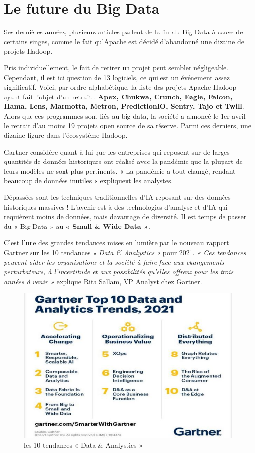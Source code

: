 \section{Le future du Big Data}
Ses dernières années, plusieurs articles parlent de la fin du Big Data à cause de certains singes, comme le fait qu’Apache est décidé d’abandonné une dizaine de projets Hadoop.

Pris individuellement, le fait de retirer un projet peut sembler négligeable. Cependant, il est ici question de 13 logiciels, ce qui est un événement assez significatif. Voici, par ordre alphabétique, la liste des projets Apache Hadoop ayant fait l’objet d’un retrait : \textbf{Apex, Chukwa, Crunch, Eagle, Falcon, Hama, Lens, Marmotta, Metron, PredictionIO, Sentry, Tajo et Twill}. Alors que ces programmes sont liés au big data, la société a annoncé le 1er avril le retrait d’au moins 19 projets open source de sa réserve. Parmi ces derniers, une dizaine figure dans l’écosystème Hadoop.

Gartner considère quant à lui que les entreprises qui reposent sur de larges quantités de données historiques ont réalisé avec la pandémie que la plupart de leurs modèles ne sont plus pertinents. « La pandémie a tout changé, rendant beaucoup de données inutiles » expliquent les analystes.

Dépassées sont les techniques traditionnelles d’IA reposant sur des données historiques massives ! L’avenir est à des technologies d’analyse et d’IA qui requièrent moins de données, mais davantage de diversité. Il est temps de passer du « Big Data » au \textbf{« Small \& Wide Data »}.

C’est l’une des grandes tendances mises en lumière par le nouveau rapport Gartner sur les 10 tendances \textit{ « Data \& Analystics »} pour 2021. \textit{ « Ces tendances peuvent aider les organisations et la société à faire face aux changements perturbateurs, à l’incertitude et aux possibilités qu’elles offrent pour les trois années à venir »} explique Rita Sallam, VP Analyst chez Gartner.

\begin{figure}[h]
	\centering
	\includegraphics[scale=0.6]{img/part1/1.12}
	\caption{les 10 tendances « Data \& Analystics »}
\end{figure}